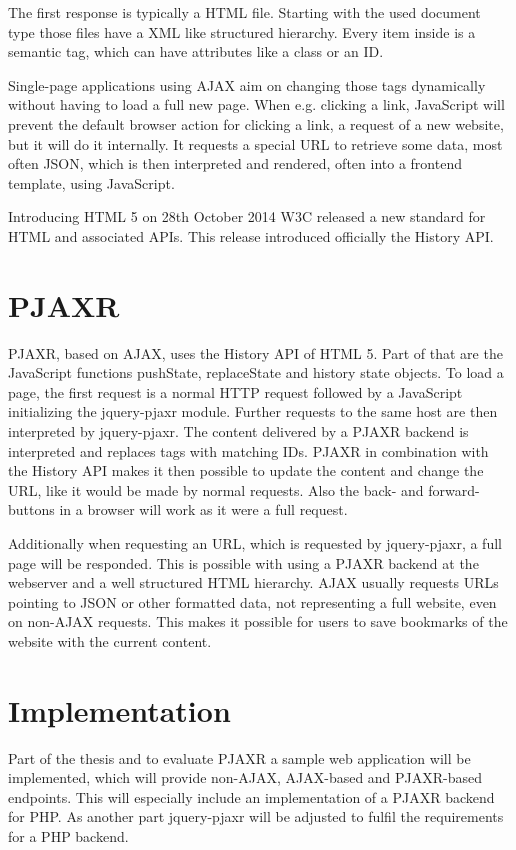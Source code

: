 \documentclass[f,bachelor,binding,twoside,palatino]{WeSTthesis}
\def \ajax {AJAX}
\def \pjaxr {PJAXR}
\def \jqueryPjaxr {jquery-pjaxr}
\def \httpRequest {HTTP request}
\def \SinglePageApplication {Single-page application}
\begin{document}
  The first response is typically a HTML file.
  Starting with the used document type those files have a XML like structured hierarchy.
  Every item inside is a semantic tag, which can have attributes like a class or an ID.

  \SinglePageApplication{}s using \ajax{} aim on changing those tags dynamically without having to load a full new page.
  When e.g. clicking a link, JavaScript will prevent the default browser action for clicking a link, a request of a new website, but it will do it internally.
  It requests a special URL to retrieve some data, most often JSON, which is then interpreted and rendered, often into a frontend template, using JavaScript.

  Introducing HTML 5 on 28th October 2014 W3C released a new standard for HTML and associated APIs. 
  This release introduced officially the History API.
  
\section{\pjaxr{}}
  \pjaxr{}, based on \ajax{}, uses the History API of HTML 5.
  Part of that are the JavaScript functions pushState, replaceState and history state objects.
  To load a page, the first request is a normal \httpRequest{} followed by a JavaScript initializing the \jqueryPjaxr{} module.
  Further requests to the same host are then interpreted by \jqueryPjaxr{}.
  The content delivered by a \pjaxr{} backend is interpreted and replaces tags with matching IDs.
  \pjaxr{} in combination with the History API makes it then possible to update the content and change the URL, like it would be made by normal requests.
  Also the back- and forward-buttons in a browser will work as it were a full request.
  
  Additionally when requesting an URL, which is requested by \jqueryPjaxr{}, a full page will be responded.
  This is possible with using a \pjaxr{} backend at the webserver and a well structured HTML hierarchy.
  \ajax{} usually requests URLs pointing to JSON or other formatted data, not representing a full website, even on non-\ajax{} requests.
  This makes it possible for users to save bookmarks of the website with the current content.

\section{Implementation}
  Part of the thesis and to evaluate \pjaxr{} a sample web application will be implemented, which will provide non-\ajax{}, \ajax{}-based and \pjaxr{}-based endpoints.
  This will especially include an implementation of a \pjaxr{} backend for PHP. As another part \jqueryPjaxr{} will be adjusted to fulfil the requirements for a PHP backend.
\end{document}
